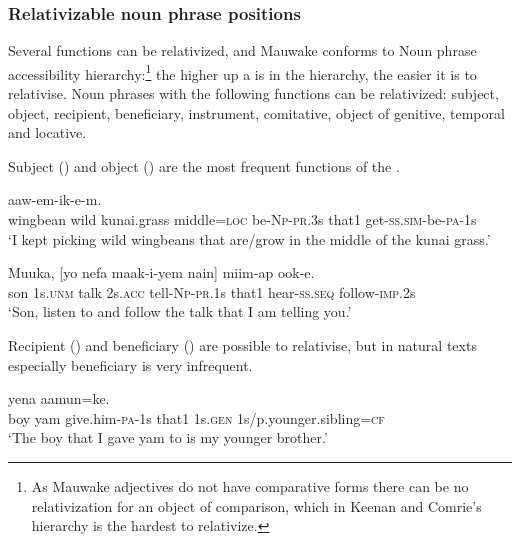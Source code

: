 \subsubsection[Relativizable noun phrase positions]{Relativizable noun phrase positions}

Several  functions can be relativized, and Mauwake conforms to  Noun phrase accessibility hierarchy:\footnote{As Mauwake adjectives do not have comparative forms there can be no relativization for an object of comparison, which in Keenan and Comrie's hierarchy is the hardest to relativize.}  the higher up a  is in the hierarchy, the easier it is to relativise. Noun phrases with the following functions can be relativized: subject, object, recipient, beneficiary, instrument, comitative, object of genitive, temporal and locative. 

Subject () and object () are the most frequent functions of the .

\ea%
\label{ex:x1537}
\gll [\textstyleEmphasizedVernacularWords{Mesa}  \textstyleEmphasizedVernacularWords{asia}  fiker(a)  gone=pa  ika-i-ya  nain] aaw-em-ik-e-m.\\
wingbean  wild  kunai.grass  middle=\textsc{loc} be-\textsc{Np}-\textsc{pr}.3s that1 get-\textsc{ss}.\textsc{sim}-be-\textsc{pa}-1s\\
\glt`I kept picking wild wingbeans that are/grow in the middle of the kunai grass.'
\z


\ea%
\label{ex:x1538}
\gll Muuka,  [yo    nefa  maak-i-yem  nain]  miim-ap ook-e.\\
son  1s.\textsc{unm} talk 2s.\textsc{acc} tell-\textsc{Np}-\textsc{pr}.1s that1 hear-\textsc{ss}.\textsc{seq} follow-\textsc{imp}.2s\\
\glt`Son, listen to and follow the talk that I am telling you.'
\z


Recipient () and beneficiary () are possible to relativise, but in natural texts especially beneficiary is very infrequent.

\ea%
\label{ex:x1539}
  yena  aamun=ke.\\
boy  yam  give.him-\textsc{pa}-1s that1 1s.\textsc{gen} 1s/p.younger.sibling=\textsc{cf}\\
\glt`The boy that I gave yam to is my younger brother.'
\z


